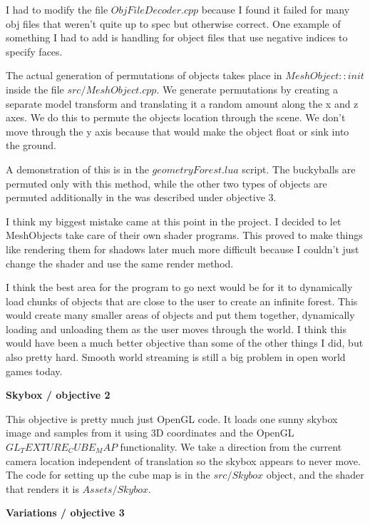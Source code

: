 \documentclass[10pt]{article}
\begin{document}
	I had to modify the file $ObjFileDecoder.cpp$ because I found it failed for many obj files that weren't quite up to spec but otherwise correct. One example of something I had to add is handling for object files that use negative indices to specify faces.
	
	The actual generation of permutations of objects takes place in $MeshObject::init$ inside the file $src/MeshObject.cpp$. We generate permutations by creating a separate model transform and translating it a random amount along the x and z axes. We do this to permute the objects location through the scene. We don't move through the y axis because that would make the object float or sink into the ground.
	
	A demonstration of this is in the $geometryForest.lua$ script. The buckyballs are permuted only with this method, while the other two types of objects are permuted additionally in the was described under objective 3.
	
	I think my biggest mistake came at this point in the project. I decided to let MeshObjects take care of their own shader programs. This proved to make things like rendering them for shadows later much more difficult because I couldn't just change the shader and use the same render method.
	
	I think the best area for the program to go next would be for it to dynamically load chunks of objects that are close to the user to create an infinite forest. This would create many smaller areas of objects and put them together, dynamically loading and unloading them as the user moves through the world. I think this would have been a much better objective than some of the other things I did, but also pretty hard. Smooth world streaming is still a big problem in open world games today.
		
	\begin{center}
		\bf Skybox / objective 2
	\end{center}	
	
	This objective is pretty much just OpenGL code. It loads one sunny skybox image and samples from it using 3D coordinates and the OpenGL $GL_TEXTURE_CUBE_MAP$ functionality. We take a direction from the current camera location independent of translation so the skybox appears to never move. The code for setting up the cube map is in the $src/Skybox$ object, and the shader that renders it is $Assets/Skybox$.
	
	\begin{center}
		\bf Variations / objective 3
	\end{center}
	
\end{document}
